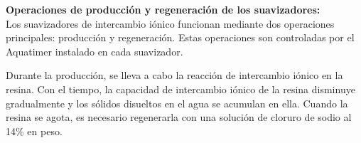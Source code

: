 
\textbf{Operaciones de producción y regeneración de los suavizadores:}\\
Los suavizadores de intercambio iónico funcionan mediante dos operaciones principales: producción y regeneración. Estas operaciones son controladas por el Aquatimer instalado en cada suavizador.

Durante la producción, se lleva a cabo la reacción de intercambio iónico en la resina. Con el tiempo, la capacidad de intercambio iónico de la resina disminuye gradualmente y los sólidos disueltos en el agua se acumulan en ella. Cuando la resina se agota, es necesario regenerarla con una solución de cloruro de sodio al 14\% en peso.
